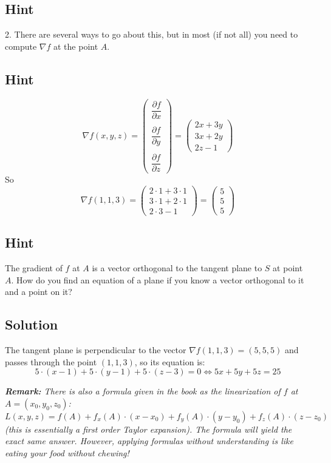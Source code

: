 \documentclass[a4paper,10pt]{article}
\begin{document}
\subsection{Hint}
2. There are several ways to go about this, but in most (if not all) you need to compute $\nabla f$ at the point $A$.

\subsection{Hint}
\[
    \nabla f(x,y,z) = \begin{pmatrix}
        \dfrac{\partial f}{\partial x} \\ \\ \dfrac{\partial f}{\partial y} \\ \\ \dfrac{\partial f}{\partial z}
    \end{pmatrix} = \begin{pmatrix}
        2x+3y \\ 3x+2y \\ 2z-1
    \end{pmatrix}
\]
So
\[
    \nabla f(1,1,3) = \begin{pmatrix}
        2\cdot 1+3\cdot 1 \\ 3\cdot 1+2\cdot 1 \\ 2\cdot 3-1
    \end{pmatrix} = \begin{pmatrix}
        5 \\ 5 \\ 5
    \end{pmatrix}
\]

\subsection{Hint}
The gradient of $f$ at $A$ is a vector orthogonal to the tangent plane to $S$ at point $A$. How do you find an equation of a plane if you know a vector orthogonal to it and a point on it?

\subsection{Solution}
The tangent plane is perpendicular to the vector $\nabla f(1, 1, 3) = (5, 5, 5)$ and passes through the point $(1, 1, 3)$, so its equation is:
\[
    5\cdot(x-1) + 5\cdot (y-1) + 5 \cdot (z-3) = 0 \iff 5x+5y+5z = 25
\]

\emph{\textbf{Remark:} There is also a formula given in the book as the linearization of $f$ at $A = (x_0, y_0, z_0)$:}
\[
    L(x,y,z) = f(A) + f_x(A)\cdot (x - x_0) + f_y(A)\cdot (y - y_0) + f_z(A)\cdot (z - z_0)
\]
\emph{(this is essentially a first order Taylor expansion). The formula will yield the exact same answer. However, applying formulas without understanding is like eating your food without chewing!}
\end{document}
